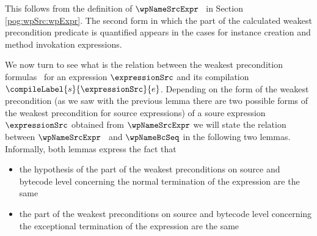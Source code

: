 This follows from the definition of $\wpNameSrcExpr$ \ in Section \ref{pog:wpSrc:wpExpr}. The second form  
in which the part of the calculated weakest precondition predicate is quantified  
appears in the cases for instance creation and method invokation expressions.



%


We now turn to see what is the relation between  the weakest precondition formulas \ for  an expression $\expressionSrc$ 
and its compilation $\compileLabel{s}{\expressionSrc}{e}$. 
Depending on the form of the weakest precondition  (as we saw with the previous lemma there are two possible forms of the weakest precondition for source expressions) 
of a soure expression $\expressionSrc $ obtained from  $\wpNameSrcExpr$ 
 we will state the relation between $\wpNameSrcExpr$  \ and $\wpNameBcSeq$  in the following two lemmas.  
Informally, both lemmas express the fact that 
\begin{itemize}
  \item the hypothesis of the part of the weakest preconditions on  source and bytecode level
concerning the normal termination of the expression  are the same  
   \item   the part of the weakest preconditions on  source and bytecode level concerning the exceptional termination 
           of the expression are the same  
\end{itemize}



